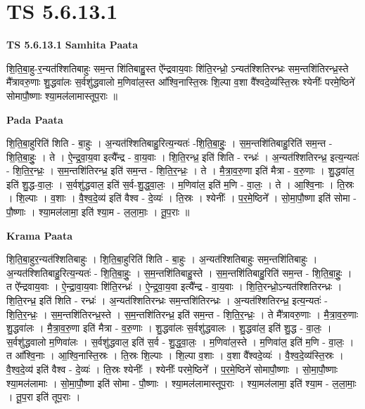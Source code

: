 \documentclass[17pt]{extarticle}
\begin{document}
\section{ TS 5.6.13.1 }

\textbf{TS 5.6.13.1 } \newline
\textbf{Samhita Paata} \newline

शि॒ति॒बा॒हु-र॒न्यत॑श्शितिबाहुः सम॒न्त शि॑तिबाहु॒स्त ऐ᳚न्द्रवाय॒वाः शि॑ति॒रन्ध्रो॒ ऽन्यत॑श्शितिरन्ध्रः सम॒न्तशि॑तिरन्ध्र॒स्ते मै᳚त्रावरु॒णाः शु॒द्धवा॑लः स॒र्वशु॑द्धवालो म॒णिवा॑ल॒स्त आ᳚श्वि॒नास्ति॒स्रः शि॒ल्पा व॒शा वै᳚श्वदे॒व्य॑स्ति॒स्रः श्येनीः᳚ परमे॒ष्ठिने॑ सोमापौ॒ष्णाः श्या॒मल॑लामास्तूप॒राः ॥ \newline

\textbf{Pada Paata} \newline

शि॒ति॒बा॒हुरिति॑ शिति - बा॒हुः । अ॒न्यत॑श्शितिबाहु॒रित्य॒न्यतः॑ -शि॒ति॒बा॒हुः॒ । स॒म॒न्तशि॑तिबाहु॒रिति॑ सम॒न्त - शि॒ति॒बा॒हुः॒ । ते । ऐ॒न्द्र॒वा॒य॒वा इत्यै᳚न्द्र - वा॒य॒वाः । शि॒ति॒रन्ध्र॒ इति॑ शिति - रन्ध्रः॑ । अ॒न्यत॑श्शितिरन्ध्र॒ इत्य॒न्यतः॑ - शि॒ति॒र॒न्ध्रः॒ । स॒म॒न्तशि॑तिरन्ध्र॒ इति॑ सम॒न्त - शि॒ति॒र॒न्ध्रः॒ । ते । मै॒त्रा॒व॒रु॒णा इति॑ मैत्रा - व॒रु॒णाः । शु॒द्धवा॑ल॒ इति॑ शु॒द्ध-वा॒लः॒ । स॒र्वशु॑द्धवाल॒ इति॑ स॒र्व-शु॒द्ध॒वा॒लः॒ । म॒णिवा॑ल॒ इति॑ म॒णि - वा॒लः॒ । ते । आ॒श्वि॒नाः । ति॒स्रः । शि॒ल्पाः । व॒शाः । वै॒श्व॒दे॒व्य॑ इति॑ वैश्व - दे॒व्यः॑ । ति॒स्रः । श्येनीः᳚ । प॒र॒मे॒ष्ठिने᳚ । सो॒मा॒पौ॒ष्णा इति॑ सोमा - पौ॒ष्णाः । श्या॒मल॑लामा॒ इति॑ श्या॒म - ल॒ला॒माः॒ । तू॒प॒राः ॥  \newline


\textbf{Krama Paata} \newline

शि॒ति॒बा॒हुर॒न्यत॑श्शितिबाहुः । शि॒ति॒बा॒हुरिति॑ शिति - बा॒हुः । अ॒न्यत॑श्शितिबाहुः सम॒न्तशि॑तिबाहुः । अ॒न्यत॑श्शितिबाहु॒रित्य॒न्यतः॑ - शि॒ति॒बा॒हुः॒ । स॒म॒न्तशि॑तिबाहु॒स्ते । स॒म॒न्तशि॑तिबाहु॒रिति॑ सम॒न्त - शि॒ति॒बा॒हुः॒ । त ऐ᳚न्द्रवाय॒वाः । ऐ॒न्द्रा॒वा॒य॒वाः शि॑ति॒रन्ध्रः॑ । ऐ॒न्द्र॒वा॒य॒वा इत्यै᳚न्द्र - वा॒य॒वाः । शि॒ति॒रन्ध्रो॒ऽन्यत॑श्शितिरन्ध्रः । शि॒ति॒रन्ध्र॒ इति॑ शिति - रन्ध्रः॑ । अ॒न्यत॑श्शितिरन्ध्रः सम॒न्तशि॑तिरन्ध्रः । अ॒न्यत॑श्शितिरन्ध्र॒ इत्य॒न्यतः॑ - शि॒ति॒र॒न्ध्रः॒ । स॒म॒न्तशि॑तिरन्ध्र॒स्ते । स॒म॒न्तशि॑तिरन्ध्र॒ इति॑ सम॒न्त - शि॒ति॒र॒न्ध्रः॒ । ते मै᳚त्रावरु॒णाः । मै॒त्रा॒व॒रु॒णाः शु॒द्धवा॑लः । मै॒त्रा॒व॒रु॒णा इति॑ मैत्रा - व॒रु॒णाः । शु॒द्धवा॑लः स॒र्वशु॑द्धवालः । शु॒द्धवा॑ल॒ इति॑ शु॒द्ध - वा॒लः॒ । स॒र्वशु॑द्धवालो म॒णिवा॑लः । स॒र्वशु॑द्धवाल॒ इति॑ स॒र्व - शु॒द्ध॒वा॒लः॒ । म॒णिवा॑ल॒स्ते । म॒णिवा॑ल॒ इति॑ म॒णि - वा॒लः॒ । त आ᳚श्वि॒नाः । आ॒श्वि॒नास्ति॒स्रः । ति॒स्रः शि॒ल्पाः । शि॒ल्पा व॒शाः । व॒शा वै᳚श्वदे॒व्यः॑ । वै॒श्व॒दे॒व्य॑स्ति॒स्रः । वै॒श्व॒दे॒व्य॑ इति॑ वैश्व - दे॒व्यः॑ । ति॒स्रः श्येनीः᳚ । श्येनीः᳚ परमे॒ष्ठिने᳚ । प॒र॒मे॒ष्ठिने॑ सोमापौ॒ष्णाः । सो॒मा॒पौ॒ष्णाः श्या॒मल॑लामाः । सो॒मा॒पौ॒ष्णा इति॑ सोमा - पौ॒ष्णाः । श्या॒मल॑लामास्तूप॒राः । श्या॒मल॑लामा॒ इति॑ श्या॒म - ल॒ला॒माः॒ । तू॒प॒रा इति॑ तूप॒राः । \newline
\end{document}
